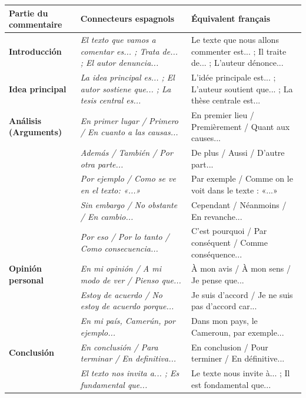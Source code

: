 \documentclass[11pt]{article}
\newcommand{\esp}[1]{\ifmmode\text{\textit{#1}}\else\begingroup\selectlanguage{spanish}\itshape #1\endgroup\fi}
\begin{document}
\begin{center}
\begin{tabularx}{\linewidth}{|X|X|X|}
\hline
\rowcolor{popblueL}
\textbf{Partie du commentaire} & \textbf{Connecteurs espagnols} & \textbf{Équivalent français} \\
\hline
\textbf{Introducción} & \esp{El texto que vamos a comentar es... ; Trata de... ; El autor denuncia...} & Le texte que nous allons commenter est... ; Il traite de... ; L'auteur dénonce... \\
\hline
\textbf{Idea principal} & \esp{La idea principal es... ; El autor sostiene que... ; La tesis central es...} & L'idée principale est... ; L'auteur soutient que... ; La thèse centrale est... \\
\hline
\textbf{Análisis (Arguments)} & \esp{En primer lugar / Primero / En cuanto a las causas...} & En premier lieu / Premièrement / Quant aux causes... \\
& \esp{Además / También / Por otra parte...} & De plus / Aussi / D'autre part... \\
& \esp{Por ejemplo / Como se ve en el texto: «...»} & Par exemple / Comme on le voit dans le texte : «...» \\
& \esp{Sin embargo / No obstante / En cambio...} & Cependant / Néanmoins / En revanche... \\
& \esp{Por eso / Por lo tanto / Como consecuencia...} & C'est pourquoi / Par conséquent / Comme conséquence... \\
\hline
\textbf{Opinión personal} & \esp{En mi opinión / A mi modo de ver / Pienso que...} & À mon avis / À mon sens / Je pense que... \\
& \esp{Estoy de acuerdo / No estoy de acuerdo porque...} & Je suis d'accord / Je ne suis pas d'accord car... \\
& \esp{En mi país, Camerún, por ejemplo...} & Dans mon pays, le Cameroun, par exemple... \\
\hline
\textbf{Conclusión} & \esp{En conclusión / Para terminar / En definitiva...} & En conclusion / Pour terminer / En définitive... \\
& \esp{El texto nos invita a... ; Es fundamental que...} & Le texte nous invite à... ; Il est fondamental que... \\
\hline
\end{tabularx}
\end{center}
\end{document}
